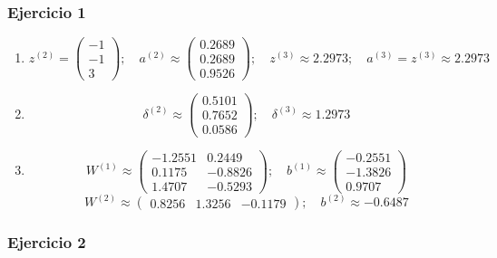 \documentclass[11pt]{article}
\begin{document}
\subsubsection*{Ejercicio 1}

\begin{enumerate}
\item 
\begin{equation}
z^{(2)} =
\begin{pmatrix}
-1 \\
-1 \\
3
\end{pmatrix}; \quad 
a^{(2)} \approx
\begin{pmatrix}
0.2689 \\
0.2689 \\
0.9526
\end{pmatrix}; \quad 
z^{(3)} \approx 2.2973; \quad a^{(3)} = z^{(3)} \approx 2.2973
\end{equation}
\item 
\begin{equation}
\delta^{(2)} \approx
\begin{pmatrix}
0.5101 \\
0.7652 \\
0.0586
\end{pmatrix}; \quad 
\delta^{(3)} \approx 1.2973
\end{equation}
\item 
\begin{equation}
W^{(1)} \approx
\begin{pmatrix}
-1.2551 & 0.2449 \\
0.1175 & -0.8826 \\
1.4707 & -0.5293
\end{pmatrix}; \quad 
b^{(1)} \approx 
\begin{pmatrix}
-0.2551 \\
-1.3826 \\
0.9707 
\end{pmatrix}
\end{equation}
\begin{equation}
W^{(2)} \approx
\begin{pmatrix}
0.8256 & 1.3256 & -0.1179
\end{pmatrix}; \quad 
b^{(2)} \approx -0.6487
\end{equation}
\end{enumerate}

\subsubsection*{Ejercicio 2}
\end{document}
